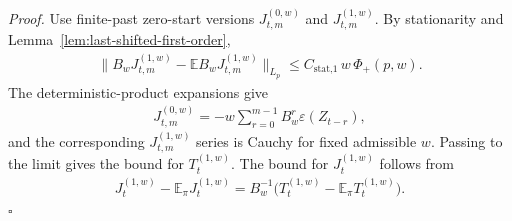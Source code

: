 \textit{Proof.} Use finite-past zero-start versions
\(J_{t, m}^{(0, w)}\) and \(J_{t, m}^{(1, w)}\). By stationarity and
Lemma~\ref{lem:last-shifted-first-order},
\begin{equation}
\begin{aligned}
\lVert  B_w J_{t, m}^{(1, w)} - \mathbb{E} B_w J_{t, m}^{(1, w)}  \rVert_{L_p}
  \le C_{\text{stat,1}} \, w \, \Phi_+(p, w).
\end{aligned}
\end{equation}
The deterministic-product expansions give
\begin{equation}
\begin{aligned}
J_{t, m}^{(0, w)}
  = -w \sum_{r = 0}^{m - 1} B_w^r \varepsilon(Z_{t - r}),
\end{aligned}
\end{equation}
and the corresponding \(J_{t,m}^{(1,w)}\) series is Cauchy for fixed admissible
\(w\). Passing to the limit gives the bound for \(T_t^{(1,w)}\). The bound for
\(J_t^{(1,w)}\) follows from
\begin{equation}
\begin{aligned}
J_t^{(1,w)} - \mathbb{E}_\pi J_t^{(1,w)}
  = B_w^{-1}\bigl(T_t^{(1,w)} - \mathbb{E}_\pi T_t^{(1,w)}\bigr).
\end{aligned}
\end{equation}
\(\square\)


